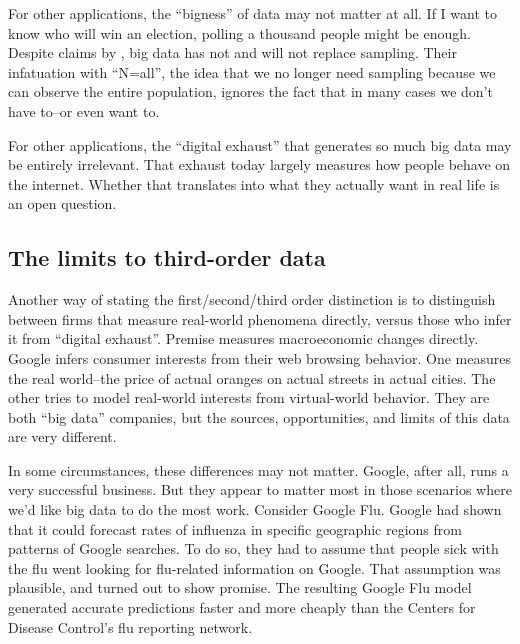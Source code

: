 \documentclass[12pt]{article}
\begin{document}
For other applications, the ``bigness'' of data may not matter at
all. If I want to know who will win an election, polling a thousand
people might be enough. Despite claims by \cite{mayer2013big}, big
data has not and will not replace sampling. Their infatuation with
``N=all'', the idea that we no longer need sampling because we can
observe the entire population, ignores the fact that in many cases we
don't have to--or even want to.

For other applications, the ``digital exhaust'' that generates so much
big data may be entirely irrelevant. That exhaust today largely
measures how people behave on the internet. Whether that translates
into what they actually want in real life is an open question. 




\subsection{The limits to third-order data}
\label{sec:limits-third-order}

Another way of stating the first/second/third order distinction is to
distinguish between firms that measure real-world phenomena directly,
versus those who infer it from ``digital exhaust''. Premise measures
macroeconomic changes directly. Google infers consumer interests from
their web browsing behavior. One measures the real world--the price of
actual oranges on actual streets in actual cities. The other tries to
model real-world interests from virtual-world behavior. They are both
``big data'' companies, but the sources, opportunities, and limits of
this data are very different. 

In some circumstances, these differences may not matter. Google, after
all, runs a very successful business. But they appear to matter most
in those scenarios where we'd like big data to do the most
work. Consider Google Flu. Google had shown that it could forecast
rates of influenza in specific geographic regions from patterns of
Google searches. To do so, they had to assume that people sick with
the flu went looking for flu-related information on Google. That
assumption was plausible, and turned out to show promise. The
resulting Google Flu model generated accurate predictions faster and
more cheaply than the Centers for Disease Control's flu reporting
network.
\end{document}
